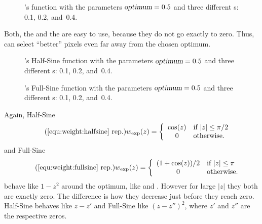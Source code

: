\begin{figure}[htbp]
  \ifreferencemanual\begin{maxipage}\fi
  \centering
  \ifreferencemanual\end{maxipage}\fi

  \caption[ function]{\label{fig:lorentzian}%
    \App{}'s  function with the parameters $\textsl{optimum} = 0.5$ and
    three different s: 0.1, 0.2, and~0.4.}
\end{figure}


Both, the  and the  are easy to use, because they do
not go exactly to zero.  Thus, \App{} can select ``better'' pixels even far away from the chosen
optimum.


\begin{figure}[htbp]
  \ifreferencemanual\begin{maxipage}\fi
  \centering
  \ifreferencemanual\end{maxipage}\fi

  \caption[Half-Sine function]{\label{fig:halfsine}%
    \App{}'s Half-Sine function with the parameters $\textsl{optimum} = 0.5$ and three
    different s: 0.1, 0.2, and~0.4.}
\end{figure}


\begin{figure}[htbp]
  \ifreferencemanual\begin{maxipage}\fi
  \centering
  \ifreferencemanual\end{maxipage}\fi

  \caption[Full-Sine function]{\label{fig:fullsine}%
    \App{}'s Full-Sine function with the parameters $\textsl{optimum} = 0.5$ and three
    different s: 0.1, 0.2, and~0.4.}
\end{figure}


Again, Half-Sine
\begin{equation}\refrep{equ:weight:halfsine}
  w_{\mathrm{exp}}(z) =
  \left\{\begin{array}{cl}
  \cos(z) & \mbox{if } |z| \leq \pi/2 \\
  0       & \mbox{otherwise.}
  \end{array}\right.
\end{equation}
and Full-Sine
\begin{equation}\refrep{equ:weight:fullsine}
  w_{\mathrm{exp}}(z) =
  \left\{\begin{array}{cl}
  (1 + \cos(z)) / 2 & \mbox{if } |z| \leq \pi \\
  0                 & \mbox{otherwise.}
  \end{array} \right.
\end{equation}
\noindent behave like $1 - z^2$ around the optimum, like  and
.  However for large $|z|$ they both are exactly zero.  The difference is
how they decrease just before they reach zero.  Half-Sine behaves like $z - z'$ and Full-Sine
like $(z - z'')^2$, where $z'$ and $z''$ are the respective zeros.


